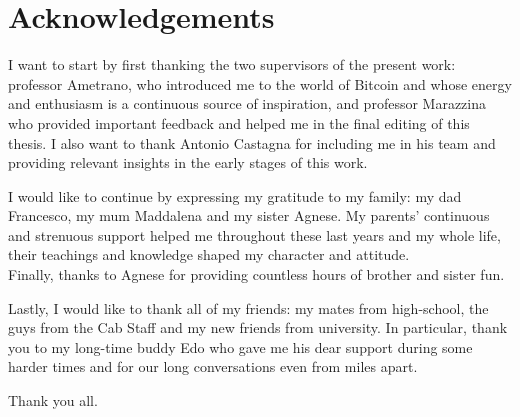 \chapter{Acknowledgements}
\label{chpr:acknowledgement}

\noindent
I want to start by first thanking the two supervisors of the present work: professor Ametrano, who introduced me to the world of Bitcoin and whose energy and enthusiasm is a continuous source of inspiration, and professor Marazzina who provided important feedback and helped me in the final editing of this thesis. I also want to thank Antonio Castagna for including me in his team and providing relevant insights in the early stages of this work.

\bigskip
\noindent
I would like to continue by expressing my gratitude to my family: my dad Francesco, my mum Maddalena and my sister Agnese. My parents' continuous and strenuous support  helped me throughout these last years and my whole life, their teachings and knowledge shaped my character and attitude. \\Finally, thanks to Agnese for providing countless hours of brother and sister fun.

\bigskip
\noindent
Lastly, I would like to thank all of my friends: my mates from high-school, the guys from the Cab Staff and my new friends from university. In particular, thank you to my long-time buddy Edo who gave me his dear support during some harder times and for our long conversations even from miles apart.



\bigskip
\noindent

\bigskip 
\noindent
Thank you all.
